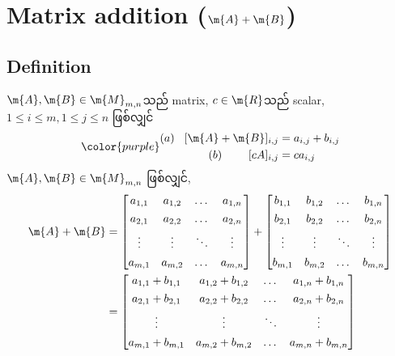 \section{Matrix addition ($\m{A}+\m{B}$)}
\subsection{Definition}
$\m{A},\m{B}\in\m{M}_{m,n}$သည် matrix, $c\in\m{R}$သည် scalar, $1 \le i \le m,1 \le j \le n$ ဖြစ်လျှင်
\begin{equation}
    {\color{purple} \begin{split}
        (a)\hspace{3mm}[\m{A}+\m{B}]_{i,j}&=a_{i,j}+b_{i,j} \\
        (b)\hspace{8.25mm}[cA]_{i,j}&=ca_{i,j}
    \end{split}}
\end{equation}
$\m{A},\m{B}\in\m{M}_{m,n}$ ဖြစ်လျှင်,
\[
    \begin{split}
        \m{A}+\m{B}&=\begin{bmatrix}
            a_{1,1} & a_{1,2} & \dots & a_{1,n} \\[4pt]
            a_{2,1} & a_{2,2} & \dots & a_{2,n} \\[4pt]
            \vdots & \vdots & \ddots & \vdots \\[4pt]
            a_{m,1} & a_{m,2} & \dots & a_{m,n}
        \end{bmatrix}+\begin{bmatrix}
            b_{1,1} & b_{1,2} & \dots & b_{1,n} \\[4pt]
            b_{2,1} & b_{2,2} & \dots & b_{2,n} \\[4pt]
            \vdots & \vdots & \ddots & \vdots \\[4pt]
            b_{m,1} & b_{m,2} & \dots & b_{m,n}
        \end{bmatrix} \\
        &=\begin{bmatrix}
            a_{1,1}+b_{1,1} & a_{1,2}+b_{1,2} & \dots & a_{1,n}+b_{1,n} \\[4pt]
            a_{2,1}+b_{2,1} & a_{2,2}+b_{2,2} & \dots & a_{2,n}+b_{2,n} \\[4pt]
            \vdots & \vdots & \ddots & \vdots \\[4pt]
            a_{m,1}+b_{m,1} & a_{m,2}+b_{m,2} & \dots & a_{m,n}+b_{m,n}
        \end{bmatrix}
    \end{split}
\]
